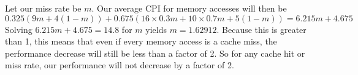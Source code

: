 \documentclass[12pt]{article}
\begin{document}
Let our miss rate be \(m\). Our average CPI for memory accesses will then be
\[0.325(9m+4(1-m))+0.675(16\times 0.3m+10\times 0.7m+5(1-m))=6.215m+4.675\]
Solving \(6.215m+4.675=14.8\) for \(m\) yields \(m=1.62912\). Because this is greater than 1, this means that even if every memory access is a cache miss,
the performance decrease will still be less than a factor of 2. So for any cache hit or miss rate, our performance will not decrease by a factor of 2.
\end{document}
